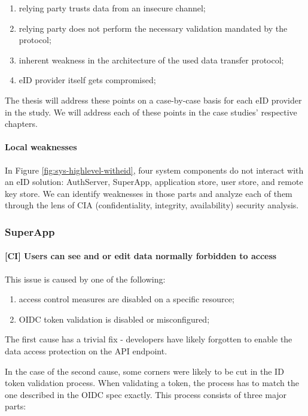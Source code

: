 \begin{enumerate}
  \item relying party trusts data from an insecure channel;
  \item relying party does not perform the necessary validation mandated by the protocol;
  \item inherent weakness in the architecture of the used data transfer protocol;
  \item eID provider itself gets compromised;
\end{enumerate}

The thesis will address these points on a case-by-case basis for each eID provider in the study. We will address each of these points in the case studies' respective chapters.

\paragraph{Local weaknesses}

In Figure \ref{fig:sys-highlevel-witheid}, four system components do not interact with an eID solution: AuthServer, SuperApp, application store, user store, and remote key store. We can identify weaknesses in those parts and analyze each of them through the lens of CIA (confidentiality, integrity, availability) security analysis.

\subsubsection{SuperApp}

\paragraph{[CI] Users can see and or edit data normally forbidden to access} This issue is caused by one of the following:

\begin{enumerate}
  \item access control measures are disabled on a specific resource;
  \item OIDC token validation is disabled or misconfigured;
\end{enumerate}

The first cause has a trivial fix - developers have likely forgotten to enable the data access protection on the API endpoint.

In the case of the second cause, some corners were likely to be cut in the ID token validation process. When validating a token, the process has to match the one described in the OIDC spec \cite{oidc} exactly. This process consists of three major parts:

